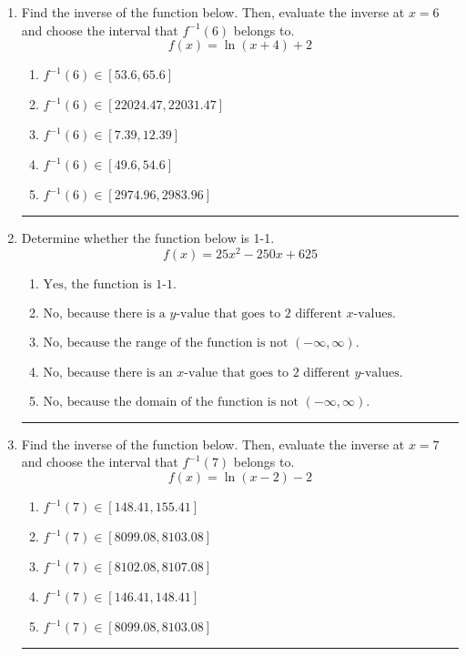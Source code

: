 \documentclass[14pt]{extbook}
\newcommand{\litem}[1]{\item#1\hspace*{-1cm}\rule{\textwidth}{0.4pt}}
\begin{document}
\begin{enumerate}
{\begin{enumerate}[label=\Alph*.]
\end{enumerate} }
\litem{
Find the inverse of the function below. Then, evaluate the inverse at $x = 6$ and choose the interval that $f^{-1}(6)$ belongs to.\[ f(x) = \ln{(x+4)}+2 \]\begin{enumerate}[label=\Alph*.]
\item \( f^{-1}(6) \in [53.6, 65.6] \)
\item \( f^{-1}(6) \in [22024.47, 22031.47] \)
\item \( f^{-1}(6) \in [7.39, 12.39] \)
\item \( f^{-1}(6) \in [49.6, 54.6] \)
\item \( f^{-1}(6) \in [2974.96, 2983.96] \)

\end{enumerate} }
\litem{
Determine whether the function below is 1-1.\[ f(x) = 25 x^2 - 250 x + 625 \]\begin{enumerate}[label=\Alph*.]
\item \( \text{Yes, the function is 1-1.} \)
\item \( \text{No, because there is a $y$-value that goes to 2 different $x$-values.} \)
\item \( \text{No, because the range of the function is not $(-\infty, \infty)$.} \)
\item \( \text{No, because there is an $x$-value that goes to 2 different $y$-values.} \)
\item \( \text{No, because the domain of the function is not $(-\infty, \infty)$.} \)

\end{enumerate} }
\litem{
Find the inverse of the function below. Then, evaluate the inverse at $x = 7$ and choose the interval that $f^{-1}(7)$ belongs to.\[ f(x) = \ln{(x-2)}-2 \]\begin{enumerate}[label=\Alph*.]
\item \( f^{-1}(7) \in [148.41, 155.41] \)
\item \( f^{-1}(7) \in [8099.08, 8103.08] \)
\item \( f^{-1}(7) \in [8102.08, 8107.08] \)
\item \( f^{-1}(7) \in [146.41, 148.41] \)
\item \( f^{-1}(7) \in [8099.08, 8103.08] \)

\end{enumerate} }
\end{enumerate}
\end{document}
